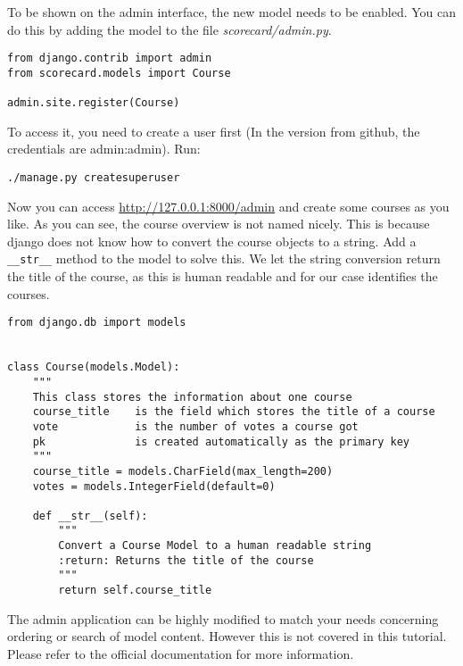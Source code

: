 To be shown on the admin interface, the new model needs to be enabled. You can do this by adding the model to the file \emph{scorecard/admin.py}.
\begin{lstlisting}[style=Python, caption=scorecard/admin.py, label=lst:admin.py]
from django.contrib import admin
from scorecard.models import Course

admin.site.register(Course)
\end{lstlisting}


To access it, you need to create a user first (In the version from github, the credentials are admin:admin). Run:
\begin{lstlisting}[style=Bash, caption=Create superuser, label=lst:create_superuser]
./manage.py createsuperuser
\end{lstlisting}
Now you can access \url{http://127.0.0.1:8000/admin} and create some courses as you like. As you can see, the course overview is not named nicely. This is because django does not know how to convert the course objects to a string. Add a \lstinline|__str__| method to the model to solve this. We let the string conversion return the title of the course, as this is human readable and for our case identifies the courses.

\begin{lstlisting}[style=Python, caption=scorecard/models.py, label=lst:models.py1]
from django.db import models


class Course(models.Model):
    """
    This class stores the information about one course
    course_title    is the field which stores the title of a course
    vote            is the number of votes a course got
    pk              is created automatically as the primary key
    """
    course_title = models.CharField(max_length=200)
    votes = models.IntegerField(default=0)

    def __str__(self):
        """
        Convert a Course Model to a human readable string
        :return: Returns the title of the course
        """
        return self.course_title
\end{lstlisting}

The admin application can be highly modified to match your needs concerning ordering or search of model content. However this is not covered in this tutorial. Please refer to the official documentation for more information.